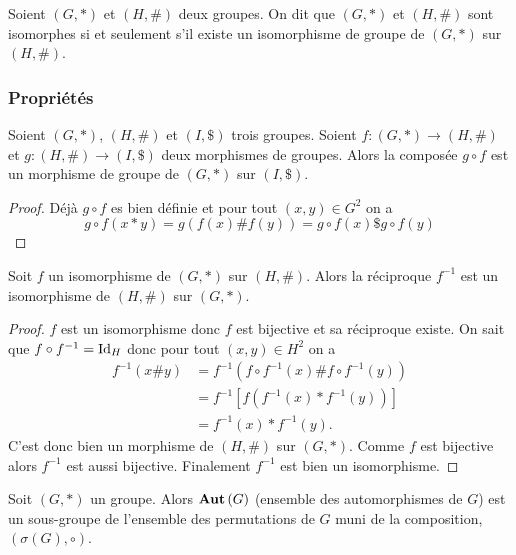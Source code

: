 \begin{defdef}
  Soient $(G,*)$ et $(H,\#)$ deux groupes. On dit que $(G,*)$ et $(H,\#)$ sont isomorphes si et seulement s'il existe un isomorphisme de groupe de $(G,*)$ sur $(H,\#)$.
\end{defdef}

\subsubsection{Propriétés}

\begin{prop}
  \label{prop:compmorph}
  Soient $(G,*)$, $(H,\#)$ et $(I,\$)$ trois groupes. Soient $f:(G,*) \longrightarrow (H,\#)$ et $g: (H,\#) \longrightarrow (I,\$)$ deux morphismes de groupes. Alors la composée $g \circ f$ est un morphisme de groupe de $(G,*)$ sur $(I,\$)$.
\end{prop}
\begin{proof}
  Déjà $g \circ f$ es bien définie et pour tout $(x,y) \in G^2$ on a
  \begin{equation}
    g \circ f (x * y) = g(f(x) \# f(y)) = g\circ f(x) \$ g\circ f(y)
  \end{equation}
\end{proof}
\begin{prop}
  \label{prop:morphinv}
  Soit $f$ un isomorphisme de $(G,*)$ sur $(H,\#)$. Alors la réciproque $f^{-1}$ est un isomorphisme de $(H,\#)$ sur $(G,*)$.
\end{prop}
\begin{proof}
  $f$ est un isomorphisme donc $f$ est bijective et sa réciproque existe. On sait que $f \circ f^{-1}=\operatorname{Id}_{H}$ donc pour tout $(x,y) \in H^2$ on a
  \begin{align}
    f^{-1}(x \# y) &=f^{-1}(f \circ f^{-1}(x) \# f \circ f^{-1}(y))\\
    &=f^{-1}[f(f^{-1}(x) *  f^{-1}(y))]\\
    &=f^{-1}(x) *  f^{-1}(y).
  \end{align}
  C'est donc bien un morphisme de $(H,\#)$ sur $(G,*)$. Comme $f$ est bijective alors $f^{-1}$ est aussi bijective. Finalement $f^{-1}$ est bien un isomorphisme.
\end{proof}
\begin{prop}
  Soit $(G,*)$ un groupe. Alors $\mathbf{Aut}\left(G\right)$ (ensemble des automorphismes de $G$) est un sous-groupe de l'ensemble des permutations de $G$ muni de la composition, $(\sigma(G), \circ)$.
\end{prop}
